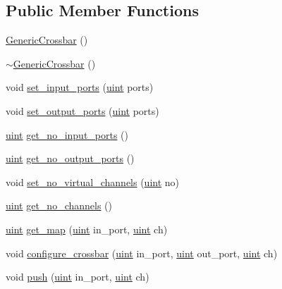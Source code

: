 \subsection*{Public Member Functions}
\begin{CompactItemize}
\item 
\hyperlink{classGenericCrossbar_4a686c329c66490d847cc938b7e02aae}{GenericCrossbar} ()
\item 
\hyperlink{classGenericCrossbar_53c13d3c966feb35331958f7a2f9f90c}{$\sim$GenericCrossbar} ()
\item 
void \hyperlink{classGenericCrossbar_c97249405a9bc78f2c1c9c28ad660472}{set\_\-input\_\-ports} (\hyperlink{outputBuffer_8h_91ad9478d81a7aaf2593e8d9c3d06a14}{uint} ports)
\item 
void \hyperlink{classGenericCrossbar_5b9a2875ec8a1bb19683304ae31e3364}{set\_\-output\_\-ports} (\hyperlink{outputBuffer_8h_91ad9478d81a7aaf2593e8d9c3d06a14}{uint} ports)
\item 
\hyperlink{outputBuffer_8h_91ad9478d81a7aaf2593e8d9c3d06a14}{uint} \hyperlink{classGenericCrossbar_8758e38060de9899fa70ad069b83e9fc}{get\_\-no\_\-input\_\-ports} ()
\item 
\hyperlink{outputBuffer_8h_91ad9478d81a7aaf2593e8d9c3d06a14}{uint} \hyperlink{classGenericCrossbar_6ca09eb5520228b39d718e3994a5b84f}{get\_\-no\_\-output\_\-ports} ()
\item 
void \hyperlink{classGenericCrossbar_e9d67e36be87ea3169baa80ae52044e3}{set\_\-no\_\-virtual\_\-channels} (\hyperlink{outputBuffer_8h_91ad9478d81a7aaf2593e8d9c3d06a14}{uint} no)
\item 
\hyperlink{outputBuffer_8h_91ad9478d81a7aaf2593e8d9c3d06a14}{uint} \hyperlink{classGenericCrossbar_945a3d32809787bd2c5ee68714467467}{get\_\-no\_\-channels} ()
\item 
\hyperlink{outputBuffer_8h_91ad9478d81a7aaf2593e8d9c3d06a14}{uint} \hyperlink{classGenericCrossbar_65b435392191561b7a4759e20aacab4e}{get\_\-map} (\hyperlink{outputBuffer_8h_91ad9478d81a7aaf2593e8d9c3d06a14}{uint} in\_\-port, \hyperlink{outputBuffer_8h_91ad9478d81a7aaf2593e8d9c3d06a14}{uint} ch)
\item 
void \hyperlink{classGenericCrossbar_50c8203133960f74f6d82649b0c864be}{configure\_\-crossbar} (\hyperlink{outputBuffer_8h_91ad9478d81a7aaf2593e8d9c3d06a14}{uint} in\_\-port, \hyperlink{outputBuffer_8h_91ad9478d81a7aaf2593e8d9c3d06a14}{uint} out\_\-port, \hyperlink{outputBuffer_8h_91ad9478d81a7aaf2593e8d9c3d06a14}{uint} ch)
\item 
void \hyperlink{classGenericCrossbar_d925d4a2c3b5b4585e087dc423eeb0b8}{push} (\hyperlink{outputBuffer_8h_91ad9478d81a7aaf2593e8d9c3d06a14}{uint} in\_\-port, \hyperlink{outputBuffer_8h_91ad9478d81a7aaf2593e8d9c3d06a14}{uint} ch)

\end{CompactItemize}
